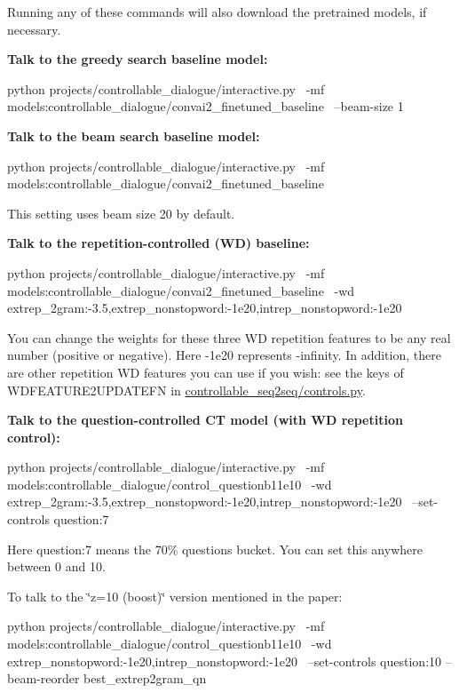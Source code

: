 Running any of these commands will also download the pretrained models, if necessary.

{\bfseries Talk to the greedy search baseline model\+:} \begin{DoxyVerb}python projects/controllable_dialogue/interactive.py \
-mf models:controllable_dialogue/convai2_finetuned_baseline \
--beam-size 1
\end{DoxyVerb}


{\bfseries Talk to the beam search baseline model\+:} \begin{DoxyVerb}python projects/controllable_dialogue/interactive.py \
-mf models:controllable_dialogue/convai2_finetuned_baseline
\end{DoxyVerb}


This setting uses beam size 20 by default.

{\bfseries Talk to the repetition-\/controlled (WD) baseline\+:} \begin{DoxyVerb}python projects/controllable_dialogue/interactive.py \
-mf models:controllable_dialogue/convai2_finetuned_baseline \
-wd extrep_2gram:-3.5,extrep_nonstopword:-1e20,intrep_nonstopword:-1e20
\end{DoxyVerb}


You can change the weights for these three WD repetition features to be any real number (positive or negative). Here {\ttfamily -\/1e20} represents -\/infinity. In addition, there are other repetition WD features you can use if you wish\+: see the keys of {\ttfamily W\+D\+F\+E\+A\+T\+U\+R\+E2\+U\+P\+D\+A\+T\+E\+FN} in {\ttfamily \hyperlink{controls_8py}{controllable\+\_\+seq2seq/controls.\+py}}.

{\bfseries Talk to the question-\/controlled CT model (with WD repetition control)\+:} \begin{DoxyVerb}python projects/controllable_dialogue/interactive.py \
-mf models:controllable_dialogue/control_questionb11e10 \
-wd extrep_2gram:-3.5,extrep_nonstopword:-1e20,intrep_nonstopword:-1e20 \
--set-controls question:7
\end{DoxyVerb}


Here {\ttfamily question\+:7} means the \textquotesingle{}70\% questions\textquotesingle{} bucket. You can set this anywhere between 0 and 10.

To talk to the \char`\"{}z=10 (boost)\char`\"{} version mentioned in the paper\+: \begin{DoxyVerb}python projects/controllable_dialogue/interactive.py \
-mf models:controllable_dialogue/control_questionb11e10 \
-wd extrep_nonstopword:-1e20,intrep_nonstopword:-1e20 \
--set-controls question:10 --beam-reorder best_extrep2gram_qn
\end{DoxyVerb}


